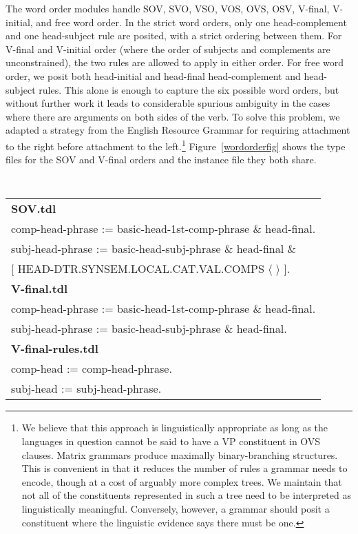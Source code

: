 The word order modules 
handle 
SOV, SVO, VSO, VOS, OVS, OSV, V-final, V-initial, and
free word order.
In the
strict word orders, only one head-complement and one head-subject rule
are posited, with a strict ordering between them.  For V-final and
V-initial order (where the order of subjects and complements are
unconstrained), %
the two rules are allowed to
apply in either order.  For  free word order, we posit both
head-initial and head-final head-complement and head-subject rules.
This alone is enough to capture the six possible word orders, but
without further work it leads to considerable spurious ambiguity in
the cases where there are arguments on both sides of the verb.  To
solve this problem, we adapted a strategy from the English Resource
Grammar for requiring attachment to the right before attachment to the
left.\footnote{We believe that this approach is linguistically
appropriate as long as the languages in question cannot be said to
have a VP constituent in OVS clauses.  Matrix grammars produce
maximally binary-branching structures.  This is convenient in that it
reduces the number of rules a grammar needs to encode, though at a
cost of arguably more complex trees.  We maintain that not all of the
constituents represented in such a tree need to be interpreted as
linguistically meaningful.  Conversely, however, a grammar
should posit a constituent where the linguistic evidence says there
must be one.}
Figure~\ref{wordorderfig} shows the type files for the SOV and
V-final orders and the instance file they both share.

\begin{figure*}[ht]
\begin{center}
{\tt\small
\begin{tabular}{l}
\hline
{\bf SOV.tdl}\\
comp-head-phrase := basic-head-1st-comp-phrase \& head-final.\\
subj-head-phrase := basic-head-subj-phrase \& head-final \&\\
   \phantom{foo}[ HEAD-DTR.SYNSEM.LOCAL.CAT.VAL.COMPS $\langle$ $\rangle$ ].\\
{\bf V-final.tdl}\\
comp-head-phrase := basic-head-1st-comp-phrase \& head-final.\\
subj-head-phrase := basic-head-subj-phrase \& head-final.\\
{\bf V-final-rules.tdl}\\
comp-head := comp-head-phrase.\\
subj-head := subj-head-phrase.\\
\hline
\end{tabular}
}
\end{center}
\caption{SOV and V-final basic word order modules}
\label{wordorderfig}
\end{figure*}


